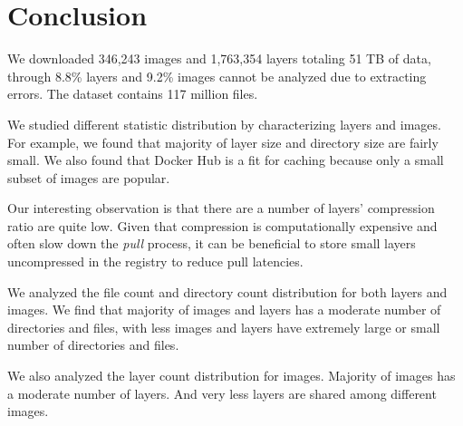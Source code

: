 \section{Conclusion}
\label{sec:conclusion}

We downloaded 346,243 images and 1,763,354 layers totaling 51 TB of data, through 8.8\% layers and 9.2\% images cannot be analyzed due to extracting errors. 
The dataset contains 117 million files.

We studied different statistic distribution by characterizing layers and images. For example, we found that majority of layer size and directory size are fairly small. We also found that Docker Hub is a fit for caching because only a small subset of images are popular.

Our interesting observation is that there are a number of layers' compression ratio are quite low. Given that compression is computationally expensive and often slow down the \textit{pull} process, it can be beneficial to store small layers uncompressed in the registry to reduce pull latencies. 

We analyzed the file count and directory count distribution for both layers and images. We find that majority of images and layers has a moderate number of directories and files, with less images and layers have extremely large or small number of directories and files.

We also analyzed the layer count distribution for images. Majority of images has a moderate number of layers. And very less layers are shared among different images.   
